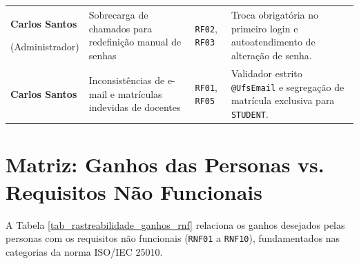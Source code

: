 \begin{table}[!ht]
\begin{tabularx}{\textwidth}{p{2.6cm} p{4.6cm} p{1.6cm} X}
\midrule
\textbf{Carlos Santos} \par (Administrador) & Sobrecarga de chamados para redefinição manual de senhas & \texttt{RF02}, \texttt{RF03} & Troca obrigatória no primeiro login e autoatendimento de alteração de senha. \\
\addlinespace
\textbf{Carlos Santos} & Inconsistências de e-mail e matrículas indevidas de docentes & \texttt{RF01}, \texttt{RF05} & Validador estrito \texttt{@UfsEmail} e segregação de matrícula exclusiva para \texttt{STUDENT}. \\
\bottomrule
\end{tabularx}
\end{table}

\section{Matriz: Ganhos das Personas vs. Requisitos Não Funcionais}
\label{sec_matriz_ganhos_rnf}

A Tabela \ref{tab_rastreabilidade_ganhos_rnf} relaciona os ganhos desejados pelas personas com os requisitos não funcionais (\texttt{RNF01} a \texttt{RNF10}), fundamentados nas categorias da norma ISO/IEC 25010.

